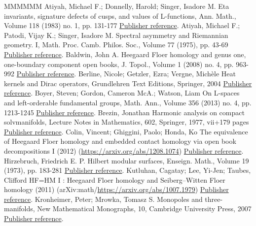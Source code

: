 \begin{thebibliography}{MMMMMM}
 Atiyah, Michael F.; Donnelly, Harold; Singer, Isadore M. Eta invariants, signature defects of cusps, and values of L-functions, Ann. Math., Volume 118 (1983) no. 1, pp. 131-177 \href{https://ahl.centre-mersenne.org/item/AHL_2020__3__1117_0/#ADS}{Publisher reference}.
 Atiyah, Michael F.; Patodi, Vijay K.; Singer, Isadore M. Spectral asymmetry and Riemannian geometry. I, Math. Proc. Camb. Philos. Soc., Volume 77 (1975), pp. 43-69 \href{https://ahl.centre-mersenne.org/item/AHL_2020__3__1117_0/#APS}{Publisher reference}.
 Baldwin, John A. Heegaard Floer homology and genus one, one-boundary component open books, J. Topol., Volume 1 (2008) no. 4, pp. 963-992 \href{https://ahl.centre-mersenne.org/item/AHL_2020__3__1117_0/#Bal}{Publisher reference}.
 Berline, Nicole; Getzler, Ezra; Vergne, Michèle Heat kernels and Dirac operators, Grundlehren Text Editions, Springer, 2004 \href{https://ahl.centre-mersenne.org/item/AHL_2020__3__1117_0/#BGV}{Publisher reference}.
 Boyer, Steven; Gordon, Cameron McA.; Watson, Liam On L-spaces and left-orderable fundamental groups, Math. Ann., Volume 356 (2013) no. 4, pp. 1213-1245 \href{https://ahl.centre-mersenne.org/item/AHL_2020__3__1117_0/#BCW}{Publisher reference}.
 Brezin, Jonathan Harmonic analysis on compact solvmanifolds, Lecture Notes in Mathematics, 602, Springer, 1977, vii+179 pages \href{https://ahl.centre-mersenne.org/item/AHL_2020__3__1117_0/#Bre}{Publisher reference}.
 Colin, Vincent; Ghiggini, Paolo; Honda, Ko The equivalence of Heegaard Floer homology and embedded contact homology via open book decompositions I (2012) (\url{https://arxiv.org/abs/1208.1074}) \href{https://ahl.centre-mersenne.org/item/AHL_2020__3__1117_0/#CGH1}{Publisher reference}.
 Hirzebruch, Friedrich E. P. Hilbert modular surfaces, Enseign. Math., Volume 19 (1973), pp. 183-281 \href{https://ahl.centre-mersenne.org/item/AHL_2020__3__1117_0/#Hir}{Publisher reference}.
 Kutluhan, Cagatay; Lee, Yi-Jen; Taubes, Clifford HF=HM I : Heegaard Floer homology and Seiberg–Witten Floer homology (2011) (arXiv:math/\url{https://arxiv.org/abs/1007.1979}) \href{https://ahl.centre-mersenne.org/item/AHL_2020__3__1117_0/#HFHM1}{Publisher reference}.
 Kronheimer, Peter; Mrowka, Tomasz S. Monopoles and three-manifolds, New Mathematical Monographs, 10, Cambridge University Press, 2007 \href{https://ahl.centre-mersenne.org/item/AHL_2020__3__1117_0/#KM}{Publisher reference}.

\end{thebibliography}
